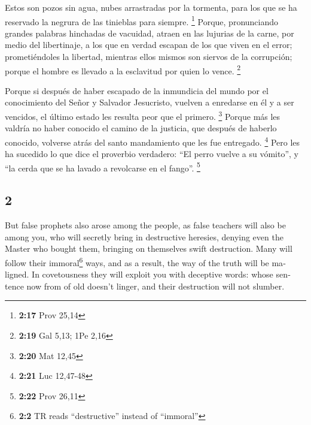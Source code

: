 \begin{paracol}{2}
 Estos son pozos sin agua, nubes arrastradas por la
tormenta, para los que se ha reservado la negrura de las tinieblas para
siempre. \footnote{\textbf{2:17} Prov 25,14}  Porque,
pronunciando grandes palabras hinchadas de vacuidad, atraen en las
lujurias de la carne, por medio del libertinaje, a los que en verdad
escapan de los que viven en el error;  prometiéndoles la
libertad, mientras ellos mismos son siervos de la corrupción; porque el
hombre es llevado a la esclavitud por quien lo vence. \footnote{\textbf{2:19}
  Gal 5,13; 1Pe 2,16}

 Porque si después de haber escapado de la inmundicia del
mundo por el conocimiento del Señor y Salvador Jesucristo, vuelven a
enredarse en él y a ser vencidos, el último estado les resulta peor que
el primero. \footnote{\textbf{2:20} Mat 12,45}  Porque
más les valdría no haber conocido el camino de la justicia, que después
de haberlo conocido, volverse atrás del santo mandamiento que les fue
entregado. \footnote{\textbf{2:21} Luc 12,47-48}  Pero
les ha sucedido lo que dice el proverbio verdadero: ``El perro vuelve a
su vómito'', y ``la cerda que se ha lavado a revolcarse en el fango''.
\footnote{\textbf{2:22} Prov 26,11}

\switchcolumn
\begin{otherlanguage}{english}

\hypertarget{section-3}{%
\section{2}\label{section-3}}

 But false prophets also arose among the people, as false
teachers will also be among you, who will secretly bring in destructive
heresies, denying even the Master who bought them, bringing on
themselves swift destruction.  Many will follow their
immoral\footnote{\textbf{2:2} TR reads ``destructive'' instead of
  ``immoral''} ways, and as a result, the way of the truth will be
maligned.  In covetousness they will exploit you with
deceptive words: whose sentence now from of old doesn't linger, and
their destruction will not slumber.


\end{otherlanguage}
\end{paracol}

